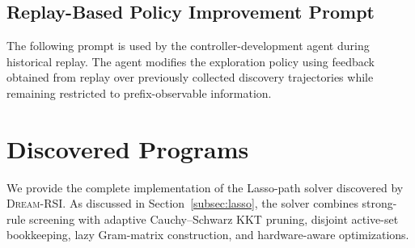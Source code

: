 


\subsection{Replay-Based Policy Improvement Prompt}
\label{app:replay-prompt}

The following prompt is used by the controller-development agent during
historical replay. The agent modifies the exploration policy using feedback
obtained from replay over previously collected discovery trajectories while
remaining restricted to prefix-observable information.



\section{Discovered Programs}
\label{app:discovered-lasso}

We provide the complete implementation of the Lasso-path solver discovered by
\textsc{Dream-RSI}. As discussed in Section~\ref{subsec:lasso}, the solver combines
strong-rule screening with adaptive Cauchy--Schwarz KKT pruning, disjoint
active-set bookkeeping, lazy Gram-matrix construction, and hardware-aware
optimizations.

